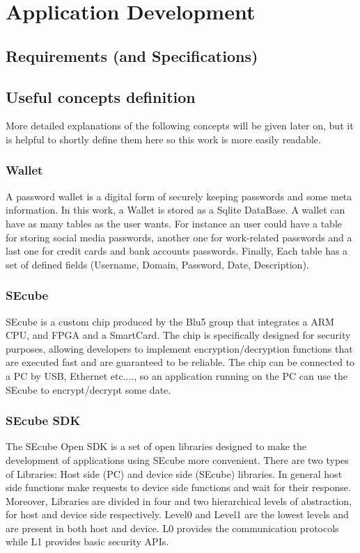 \chapter{Application Development}

\section{Requirements (and Specifications)}


\section{Useful concepts definition}

More detailed explanations of the following concepts will be given later on, but it is helpful to shortly define them here so this work is more easily readable.

\subsection{Wallet} A password wallet is a digital form of securely keeping passwords and some meta information. In this work, a Wallet is stored as a Sqlite DataBase. A wallet can have as many tables as the user wants. For instance an user could have a table for storing social media passwords, another one for work-related passwords and a last one for credit cards and bank accounts passwords. Finally, Each table has a set of defined fields (Username, Domain, Password, Date, Description).

\subsection{SEcube} SEcube is a custom chip produced by the Blu5 group \cite{Blu5} that integrates a ARM CPU, and FPGA and a SmartCard. The chip is specifically designed for security purposes, allowing developers to implement encryption/decryption functions that are executed fast and are guaranteed to be reliable. The chip can be connected to a PC by USB, Ethernet etc...., so an application running on the PC can use the SEcube to encrypt/decrypt some date.

\subsection{SEcube SDK} The SEcube Open SDK is a set of open libraries designed to make the development of applications using SEcube more convenient. There are two types of Libraries: Host side (PC) and device side (SEcube) libraries. In general host side functions make requests to device side functions and wait for their response. Moreover, Libraries are divided in four and two hierarchical levels of abstraction, for host and device side respectively. Level0 and Level1 are the lowest levels and are present in both host and device. L0 provides the communication protocols while L1 provides basic security APIs.

